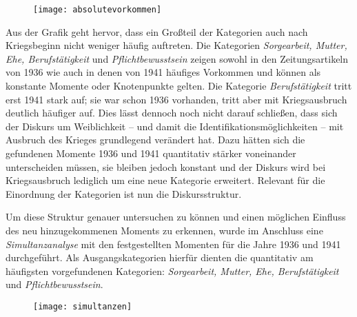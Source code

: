 \documentclass[12pt, titlepage=true, toc=bib]{scrartcl}
\begin{document}
{\begin{figure}[htbp] %
\centering
\texttt{[image: absolutevorkommen]}%
\end{figure}
 
\noindent Aus der Grafik geht hervor, dass ein Großteil der Kategorien auch nach Kriegsbeginn nicht weniger häufig auftreten. Die Kategorien \textit{Sorgearbeit, Mutter, Ehe, Berufstätigkeit} und \textit{Pflichtbewusstsein} zeigen sowohl in den Zeitungsartikeln von 1936 wie auch in denen von 1941 häufiges Vorkommen und können als konstante Momente oder Knotenpunkte gelten. Die Kategorie \textit{Berufstätigkeit} tritt erst 1941 stark auf; sie war schon 1936 vorhanden, tritt aber mit Kriegsausbruch deutlich häufiger auf. Dies lässt dennoch noch nicht darauf schließen, dass sich der Diskurs um Weiblichkeit -- und damit die Identifikationsmöglichkeiten -- mit Ausbruch des Krieges grundlegend verändert hat. Dazu hätten sich die gefundenen Momente 1936 und 1941 quantitativ stärker voneinander unterscheiden müssen, sie bleiben jedoch konstant und der Diskurs wird bei Kriegsausbruch lediglich um eine neue Kategorie erweitert. Relevant für die Einordnung der Kategorien ist nun die Diskursstruktur.

Um diese Struktur genauer untersuchen zu können und einen möglichen Einfluss des neu hinzugekommenen Moments zu erkennen, wurde im Anschluss eine \textit{Simultanzanalyse} mit den festgestellten Momenten für die Jahre 1936 und 1941 durchgeführt. Als Ausgangskategorien hierfür dienten die quantitativ am häufigsten vorgefundenen Kategorien: \textit{Sorgearbeit, Mutter, Ehe, Berufstätigkeit} und \textit{Pflichtbewusstsein}.

\begin{figure}[htbp] %
\centering
\texttt{[image: simultanzen]}%
\end{figure}

}
\end{document}

